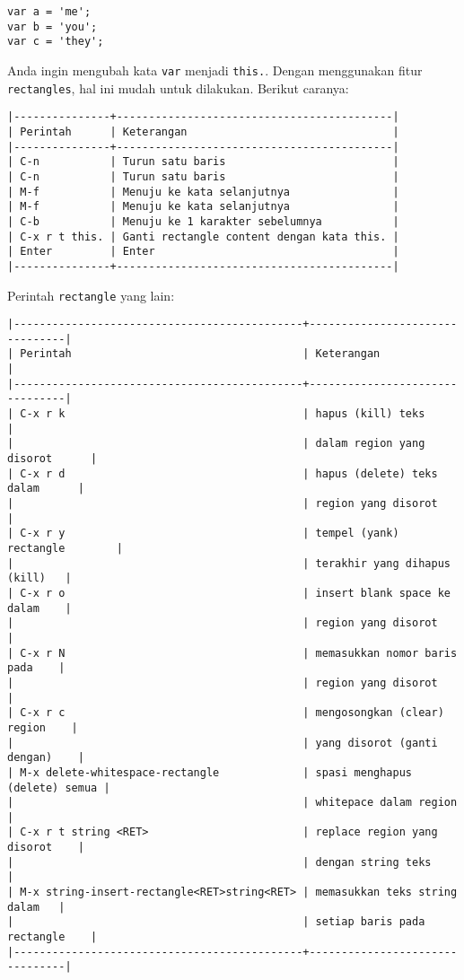 \documentclass{article}
\begin{document}
\begin{verbatim}
var a = 'me';
var b = 'you';
var c = 'they';
\end{verbatim}

Anda ingin mengubah kata \verb=var= menjadi \verb=this.=. Dengan menggunakan
fitur \verb=rectangles=, hal ini mudah untuk dilakukan. Berikut caranya:

\begin{verbatim}
|---------------+-------------------------------------------|
| Perintah      | Keterangan                                |
|---------------+-------------------------------------------|
| C-n           | Turun satu baris                          |
| C-n           | Turun satu baris                          |
| M-f           | Menuju ke kata selanjutnya                |
| M-f           | Menuju ke kata selanjutnya                |
| C-b           | Menuju ke 1 karakter sebelumnya           |
| C-x r t this. | Ganti rectangle content dengan kata this. |
| Enter         | Enter                                     |
|---------------+-------------------------------------------|
\end{verbatim}

Perintah \verb=rectangle= yang lain:

\begin{verbatim}
|---------------------------------------------+--------------------------------|
| Perintah                                    | Keterangan                     |
|---------------------------------------------+--------------------------------|
| C-x r k                                     | hapus (kill) teks              |
|                                             | dalam region yang disorot      |
| C-x r d                                     | hapus (delete) teks dalam      |
|                                             | region yang disorot            |
| C-x r y                                     | tempel (yank) rectangle        |
|                                             | terakhir yang dihapus (kill)   |
| C-x r o                                     | insert blank space ke dalam    |
|                                             | region yang disorot            |
| C-x r N                                     | memasukkan nomor baris pada    |
|                                             | region yang disorot            |
| C-x r c                                     | mengosongkan (clear) region    |
|                                             | yang disorot (ganti dengan)    |
| M-x delete-whitespace-rectangle             | spasi menghapus (delete) semua |
|                                             | whitepace dalam region         |
| C-x r t string <RET>                        | replace region yang disorot    |
|                                             | dengan string teks             |
| M-x string-insert-rectangle<RET>string<RET> | memasukkan teks string dalam   |
|                                             | setiap baris pada rectangle    |
|---------------------------------------------+--------------------------------|
\end{verbatim}
\end{document}
